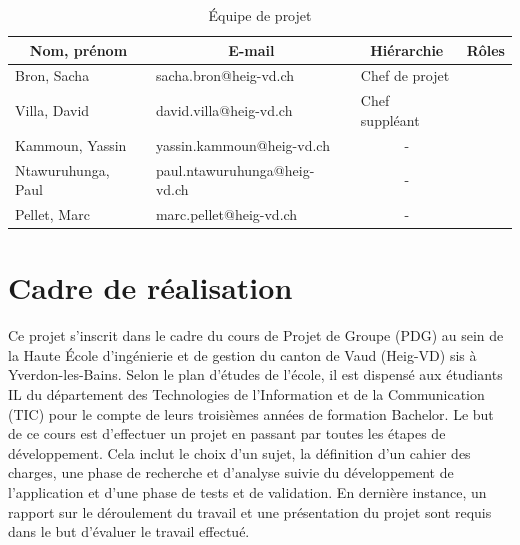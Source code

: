 \documentclass[11pt,a4paper,oldfontcommands]{memoir}
\begin{document}
\begin{table}[h]
\centering
\label{my-label}
\begin{tabular}{|l|l|c|l|}
\hline
\multicolumn{1}{|c|}{\textbf{Nom, prénom}} & \multicolumn{1}{c|}{\textbf{E-mail}} & \textbf{Hiérarchie}                 & \multicolumn{1}{c|}{\textbf{Rôles}} \\ \hline
Bron, Sacha                                & sacha.bron@heig-vd.ch                & \multicolumn{1}{l|}{Chef de projet} &                                     \\ \hline
Villa, David                               & david.villa@heig-vd.ch               & \multicolumn{1}{l|}{Chef suppléant} &                                     \\ \hline
Kammoun, Yassin                            & yassin.kammoun@heig-vd.ch            & -                                   &                                     \\ \hline
Ntawuruhunga, Paul                         & paul.ntawuruhunga@heig-vd.ch         & -                                   &                                     \\ \hline
Pellet, Marc                               & marc.pellet@heig-vd.ch               & -                                   &                                     \\ \hline
\end{tabular}
\caption{Équipe de projet}
\end{table}

\section{Cadre de réalisation}

Ce projet s'inscrit dans le cadre du cours de Projet de Groupe (PDG) au sein de la Haute École d'ingénierie et de gestion du canton de Vaud (Heig-VD) sis à Yverdon-les-Bains. Selon le plan d'études de l'école, il est dispensé aux étudiants IL du département des Technologies de l'Information et de la Communication (TIC) pour le compte de leurs troisièmes années de formation Bachelor. Le but de ce cours est d’effectuer un projet en passant par toutes les étapes de développement. Cela inclut le choix d'un sujet, la définition d’un cahier des charges, une phase de recherche et d'analyse suivie du développement de l’application et d’une phase de tests et de validation. En dernière instance, un rapport sur le déroulement du travail et une présentation du projet sont requis dans le but d'évaluer le travail effectué.
\end{document}
